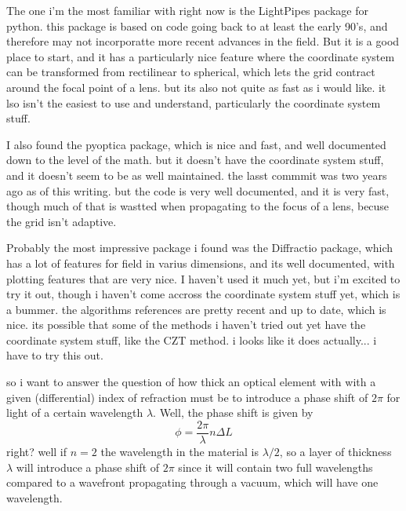 \documentclass[../../main.tex]{subfiles}
\begin{document}
The one i'm the most familiar with right now is the LightPipes package for python. this package is based on code going back to at least the early 90's, and therefore may not incorporatte more recent advances in the field. But it is a good place to start, and it has a particularly nice feature where the coordinate system can be transformed from rectilinear to spherical, which lets the grid contract around the focal point of a lens. but its also not quite as fast as i would like. it lso isn't the easiest to use and understand, particularly the coordinate system stuff.

I also found the pyoptica package, which is nice and fast, and well documented down to the level of the math. but it doesn't have the coordinate system stuff, and it doesn't seem to be as well maintained. the lasst commmit was two years ago as of this writing. but the code is very well documented, and it is very fast, though much of that is wastted when propagating to the focus of a lens, becuse the grid isn't adaptive. 

Probably the most impressive package i found was the Diffractio package, which has a lot of features for field in varius dimensions, and its well documented, with plotting features that are very nice. I haven't used it much yet, but i'm excited to try it out, though i haven't come accross the coordinate system stuff yet, which is a bummer. the algorithms references are pretty recent and up to date, which is nice. its possible that some of the methods i haven't tried out yet have the coordinate system stuff, like the CZT method. i looks like it does actually... i have to try this out. 

so i want to answer the question of how thick an optical element with with a given (differential) index of refraction must be to introduce a phase shift of $2\pi$ for light of a certain wavelength $\lambda$. Well, the phase shift is given by
\begin{equation}
    \phi=\frac{2\pi}{\lambda}n\Delta L
\end{equation}
right? well if $n=2$ the wavelength in the material is $\lambda/2$, so a layer of thickness $\lambda$ will introduce a phase shift of $2\pi$ since it will contain two full wavelengths compared to a wavefront propagating through a vacuum, which will have one wavelength.
\end{document}
